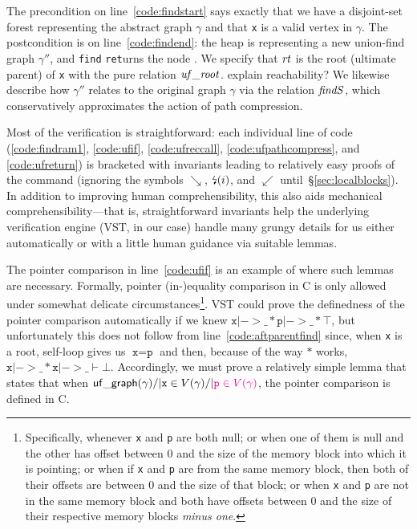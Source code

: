 The precondition on line~\ref{code:findstart} says exactly that we have a disjoint-set forest representing the abstract graph $\gamma$ and that \texttt{x} is a valid vertex in $\gamma$.  The postcondition is on line~\ref{code:findend}: the heap is representing a new union-find graph $\gamma''$, and \texttt{find} \texttt{ret}urns the node .  We specify that $\mathit{rt}$
is the root (ultimate parent) of \texttt{x} with the pure relation $\mathit{uf\_root}$.  
{\color{magenta} explain reachability?} We likewise describe how $\gamma''$ 
relates to the original graph $\gamma$ via the relation $\mathit{findS}$, which 
{\color{magenta}conservatively approximates} the action of path compression.

Most of the verification is straightforward: each individual line of code 
(\ref{code:findram1}, \ref{code:ufif}, \ref{code:ufreccall}, \ref{code:ufpathcompress}, 
and \ref{code:ufreturn}) is bracketed with invariants leading to relatively easy proofs 
of the command (ignoring the symbols $\searrow$, $\mbox{\lightning}(i)$, and $\swarrow$ 
until~\S\ref{sec:localblocks}).  In addition to improving human comprehensibility, this 
also aids mechanical comprehensibility---that is, straightforward 
invariants help the underlying verification engine (VST, in our case) handle many grungy 
details for us either automatically or with a little human guidance via suitable lemmas.

The pointer comparison in line~\ref{code:ufif} is an example of where 
such lemmas are necessary. 
Formally, pointer (in-)equality comparison in C is only allowed under somewhat delicate 
circumstances\footnote {\color{magenta}\label{footnote:pointereq}Specifically, 
whenever \texttt{x} and \texttt{p} are both null; or when one of them is null and the 
other has offset between 0 and the size of the memory block into which it is pointing; 
or when if \texttt{x} and \texttt{p} are from the same memory block, then both of their 
offsets are between 0 and the size of that block; or when \texttt{x} and \texttt{p} are 
not in the same memory block and both have offsets between 0 and the size of their 
respective memory blocks \emph{minus one}.}.  VST could prove the definedness of the 
pointer comparison automatically if we knew 
$\texttt{x} |-> \_ * \texttt{p} |-> \_ * \top$, but
unfortunately this does not follow from line~\ref{code:aftparentfind} since, 
when \texttt{x} is a root, self-loop gives us $\texttt{x}=\texttt{p}$ and 
then, because of the way $*$ works, 
$\texttt{x} |-> \_ * \texttt{x} |-> \_ \vdash \bot$.  Accordingly, we must prove a 
relatively simple lemma that states that when $\mathsf{uf\_graph}(\gamma) /| \texttt{x} 
\in V(\gamma) /| {\color{magenta} \texttt{p} \in V(\gamma)}$,
the pointer comparison is defined in C.

